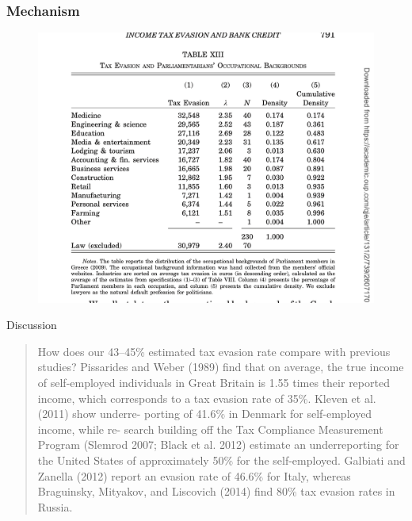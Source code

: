 \documentclass{beamer}
\begin{document}
\begin{frame}
\frametitle{Mechanism}
    \begin{figure}
        \centering
\includegraphics[width=\textwidth,height=\textheight,keepaspectratio]{Paper Presentations/T13.png}
    \end{figure}
\end{frame}

\begin{frame}{Discussion}
\begin{quote}
    How does our 43–45\% estimated tax evasion rate compare with previous studies? Pissarides and Weber (1989) find that on average, the true income of self-employed individuals in Great Britain is 1.55 times their reported income, which corresponds to a tax evasion rate of 35\%. Kleven et al. (2011) show underre- porting of 41.6\% in Denmark for self-employed income, while re- search building off the Tax Compliance Measurement Program (Slemrod 2007; Black et al. 2012) estimate an underreporting for the United States of approximately 50\% for the self-employed. Galbiati and Zanella (2012) report an evasion rate of 46.6\% for Italy, whereas Braguinsky, Mityakov, and Liscovich (2014) find 80\% tax evasion rates in Russia.
\end{quote}
    
\end{frame}
\end{document}
